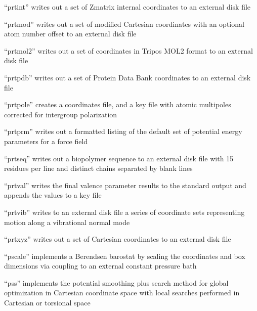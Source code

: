 \documentclass[letterpaper,11pt,english]{sphinxmanual}
\begin{document}

“prtint” writes out a set of Z\sphinxhyphen{}matrix internal
coordinates to an external disk file


“prtmod” writes out a set of modified Cartesian coordinates
with an optional atom number offset to an external disk file


“prtmol2” writes out a set of coordinates in Tripos MOL2
format to an external disk file


“prtpdb” writes out a set of Protein Data Bank coordinates
to an external disk file


“prtpole” creates a coordinates file, and a key file with
atomic multipoles corrected for intergroup polarization


“prtprm” writes out a formatted listing of the default
set of potential energy parameters for a force field


“prtseq” writes out a biopolymer sequence to an external
disk file with 15 residues per line and distinct chains
separated by blank lines


“prtval” writes the final valence parameter results to the
standard output and appends the values to a key file


“prtvib” writes to an external disk file a series of
coordinate sets representing motion along a vibrational
normal mode


“prtxyz” writes out a set of Cartesian coordinates
to an external disk file


“pscale” implements a Berendsen barostat by scaling the
coordinates and box dimensions via coupling to an external
constant pressure bath


“pss” implements the potential smoothing plus search method
for global optimization in Cartesian coordinate space with
local searches performed in Cartesian or torsional space
\end{document}
